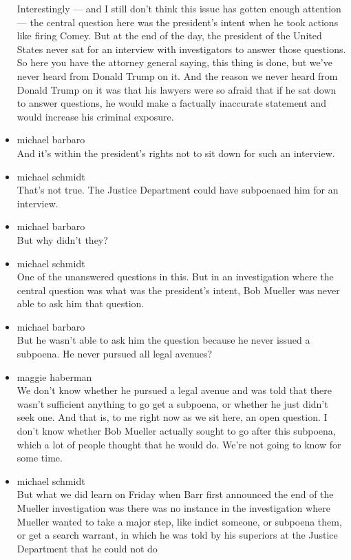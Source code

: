 \begin{itemize}
  Interestingly --- and I still don't think this issue has gotten enough
  attention --- the central question here was the president's intent
  when he took actions like firing Comey. But at the end of the day, the
  president of the United States never sat for an interview with
  investigators to answer those questions. So here you have the attorney
  general saying, this thing is done, but we've never heard from Donald
  Trump on it. And the reason we never heard from Donald Trump on it was
  that his lawyers were so afraid that if he sat down to answer
  questions, he would make a factually inaccurate statement and would
  increase his criminal exposure.
\item
  michael barbaro\\
  And it's within the president's rights not to sit down for such an
  interview.
\item
  michael schmidt\\
  That's not true. The Justice Department could have subpoenaed him for
  an interview.
\item
  michael barbaro\\
  But why didn't they?
\item
  michael schmidt\\
  One of the unanswered questions in this. But in an investigation where
  the central question was what was the president's intent, Bob Mueller
  was never able to ask him that question.
\item
  michael barbaro\\
  But he wasn't able to ask him the question because he never issued a
  subpoena. He never pursued all legal avenues?
\item
  maggie haberman\\
  We don't know whether he pursued a legal avenue and was told that
  there wasn't sufficient anything to go get a subpoena, or whether he
  just didn't seek one. And that is, to me right now as we sit here, an
  open question. I don't know whether Bob Mueller actually sought to go
  after this subpoena, which a lot of people thought that he would do.
  We're not going to know for some time.
\item
  michael schmidt\\
  But what we did learn on Friday when Barr first announced the end of
  the Mueller investigation was there was no instance in the
  investigation where Mueller wanted to take a major step, like indict
  someone, or subpoena them, or get a search warrant, in which he was
  told by his superiors at the Justice Department that he could not do

\end{itemize}

